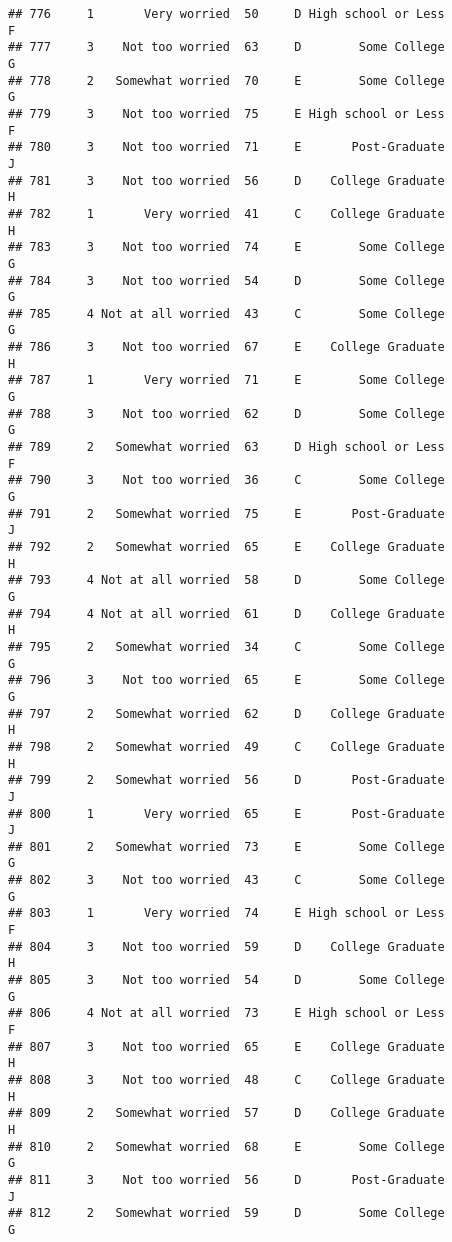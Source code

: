 \documentclass[
]{article}
\begin{document}
\begin{verbatim}
## 776     1       Very worried  50     D High school or Less         F
## 777     3    Not too worried  63     D        Some College         G
## 778     2   Somewhat worried  70     E        Some College         G
## 779     3    Not too worried  75     E High school or Less         F
## 780     3    Not too worried  71     E       Post-Graduate         J
## 781     3    Not too worried  56     D    College Graduate         H
## 782     1       Very worried  41     C    College Graduate         H
## 783     3    Not too worried  74     E        Some College         G
## 784     3    Not too worried  54     D        Some College         G
## 785     4 Not at all worried  43     C        Some College         G
## 786     3    Not too worried  67     E    College Graduate         H
## 787     1       Very worried  71     E        Some College         G
## 788     3    Not too worried  62     D        Some College         G
## 789     2   Somewhat worried  63     D High school or Less         F
## 790     3    Not too worried  36     C        Some College         G
## 791     2   Somewhat worried  75     E       Post-Graduate         J
## 792     2   Somewhat worried  65     E    College Graduate         H
## 793     4 Not at all worried  58     D        Some College         G
## 794     4 Not at all worried  61     D    College Graduate         H
## 795     2   Somewhat worried  34     C        Some College         G
## 796     3    Not too worried  65     E        Some College         G
## 797     2   Somewhat worried  62     D    College Graduate         H
## 798     2   Somewhat worried  49     C    College Graduate         H
## 799     2   Somewhat worried  56     D       Post-Graduate         J
## 800     1       Very worried  65     E       Post-Graduate         J
## 801     2   Somewhat worried  73     E        Some College         G
## 802     3    Not too worried  43     C        Some College         G
## 803     1       Very worried  74     E High school or Less         F
## 804     3    Not too worried  59     D    College Graduate         H
## 805     3    Not too worried  54     D        Some College         G
## 806     4 Not at all worried  73     E High school or Less         F
## 807     3    Not too worried  65     E    College Graduate         H
## 808     3    Not too worried  48     C    College Graduate         H
## 809     2   Somewhat worried  57     D    College Graduate         H
## 810     2   Somewhat worried  68     E        Some College         G
## 811     3    Not too worried  56     D       Post-Graduate         J
## 812     2   Somewhat worried  59     D        Some College         G

\end{verbatim}
\end{document}
